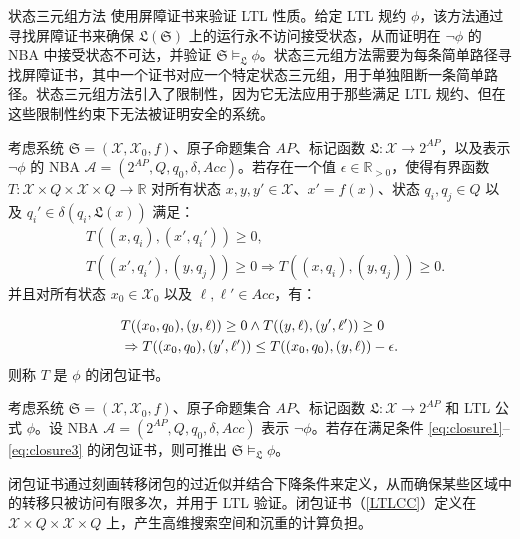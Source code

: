 状态三元组方法\cite{wongpiromsarn2015automata} 使用屏障证书来验证 LTL 性质。给定 LTL 规约 $\phi$，该方法通过寻找屏障证书来确保 $\mathfrak{L}(\mathfrak{S})$ 上的运行永不访问接受状态，从而证明在 $\neg\phi$ 的 NBA 中接受状态不可达，并验证 $\mathfrak{S} \models_{\mathfrak{L}} \phi$。状态三元组方法需要为每条简单路径寻找屏障证书，其中一个证书对应一个特定状态三元组，用于单独阻断一条简单路径。状态三元组方法引入了限制性，因为它无法应用于那些满足 LTL 规约、但在这些限制性约束下无法被证明安全的系统。


\begin{definition}
\label{LTLCC}
考虑系统 $\mathfrak{S} = (\mathcal{X}, \mathcal{X}_0, f)$、原子命题集合 $AP$、标记函数 $\mathfrak{L} : \mathcal{X} \rightarrow 2^{AP}$，以及表示 $\neg \phi$ 的 NBA $\mathcal{A} = (2^{AP}, Q, q_0, \delta, Acc)$。若存在一个值 $\epsilon \in \mathbb{R}_{> 0}$，使得有界函数 $T : \mathcal{X} \times Q \times \mathcal{X} \times Q \rightarrow \mathbb{R}$ 对所有状态 $x, y, y' \in \mathcal{X}$、$x' = f(x)$、状态 $q_i, q_j \in Q$ 以及 $q_i' \in \delta(q_i, \mathfrak{L}(x))$ 满足：
\begin{align}
    &T((x, q_i), (x', q_i')) \geq 0, \label{eq:closure1} \\
    &T((x', q_i'), (y, q_j)) \geq 0 \Rightarrow T((x, q_i), (y, q_j)) \geq 0. \label{eq:closure2}
\end{align}
并且对所有状态 $x_0 \in \mathcal{X}_0$ 以及 $\ell, \ell' \in Acc$，有：

\begin{align}
  & T((x_0, q_0), (y, \ell)) \geq 0 \land T((y, \ell), (y', \ell')) \geq 0 \notag \\
  &\Rightarrow T((x_0, q_0), (y', \ell')) \leq T((x_0, q_0), (y, \ell)) - \epsilon. \label{eq:closure3}
\end{align}
则称 $T$ 是 $\phi$ 的闭包证书。
\end{definition}

\begin{theorem}
考虑系统 $\mathfrak{S}=(\mathcal{X}, \mathcal{X}_0, f)$、原子命题集合 $AP$、标记函数 $\mathfrak{L}: \mathcal{X} \rightarrow 2^{AP}$ 和 LTL 公式 $\phi$。设 NBA $\mathcal{A} = (2^{AP}, Q, q_0, \delta, Acc)$ 表示 $\neg \phi$。若存在满足条件 \eqref{eq:closure1}--\eqref{eq:closure3} 的闭包证书，则可推出 $\mathfrak{S} \models_\mathfrak{L} \phi$。
\end{theorem}

闭包证书通过刻画转移闭包的过近似并结合下降条件来定义，从而确保某些区域中的转移只被访问有限多次，并用于 LTL 验证。闭包证书（\ref{LTLCC}）定义在 $\mathcal{X} \times Q \times \mathcal{X} \times Q$ 上，产生高维搜索空间和沉重的计算负担。

